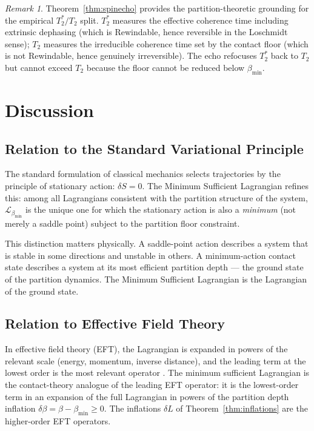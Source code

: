 \documentclass[12pt, a4paper]{article}
\theoremstyle{plain}
\theoremstyle{definition}
\theoremstyle{remark}
\newtheorem{remark}[theorem]{Remark}
\newcommand{\bmin}{\beta_{\min}}
\newcommand{\Lmin}{\mathcal{L}_{\bmin}}
\begin{document}
\begin{remark}
Theorem~\ref{thm:spinecho} provides the partition-theoretic grounding for the
empirical $T_2^*/T_2$ split. $T_2^*$ measures the effective coherence time
including extrinsic dephasing (which is Rewindable, hence reversible in the
Loschmidt sense); $T_2$ measures the irreducible coherence time set by the
contact floor (which is not Rewindable, hence genuinely irreversible). The echo
refocuses $T_2^*$ back to $T_2$ but cannot exceed $T_2$ because the floor
cannot be reduced below $\bmin$.
\end{remark}

\section{Discussion}
\label{sec:discussion}

\subsection{Relation to the Standard Variational Principle}

The standard formulation of classical mechanics selects trajectories by the
principle of stationary action: $\delta S = 0$. The Minimum Sufficient
Lagrangian refines this: among all Lagrangians consistent with the partition
structure of the system, $\Lmin$ is the unique one for which the stationary
action is also a \emph{minimum} (not merely a saddle point) subject to the
partition floor constraint.

This distinction matters physically. A saddle-point action describes a system
that is stable in some directions and unstable in others. A minimum-action
contact state describes a system at its most efficient partition depth ---
the ground state of the partition dynamics. The Minimum Sufficient Lagrangian
is the Lagrangian of the ground state.

\subsection{Relation to Effective Field Theory}

In effective field theory (EFT), the Lagrangian is expanded in powers of the
relevant scale (energy, momentum, inverse distance), and the leading term at
the lowest order is the most relevant operator \citep{georgi1994effective}.
The minimum sufficient Lagrangian is the contact-theory analogue of the leading
EFT operator: it is the lowest-order term in an expansion of the full Lagrangian
in powers of the partition depth inflation $\delta\beta = \beta - \bmin \geq 0$.
The inflations $\delta L$ of Theorem~\ref{thm:inflations} are the higher-order
EFT operators.
\end{document}
